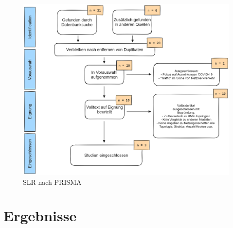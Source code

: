 \documentclass{scrartcl}
\begin{document}
\begin{figure}[h!]
   \centering
   \caption{SLR nach PRISMA}
   \label{abb1}
   \includegraphics[scale=0.28]{Bilder/prisma-exported.png}
\end{figure}

\section{Ergebnisse}
\end{document}
